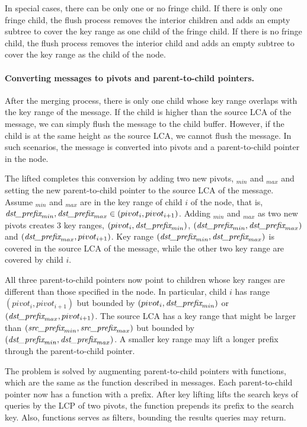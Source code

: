 In special cases, there can be only one or no fringe child.
If there is only one fringe child, the flush process removes the interior
children and adds an empty subtree to cover the key range as one child of the
fringe child.
If there is no fringe child, the flush process removes the interior child and
adds an empty subtree to cover the key range as the child of the node.

\paragraph{Converting \goto messages to pivots and parent-to-child pointers.}
After the merging process, there is only one child whose key range overlaps
with the key range of the \goto message.
If the child is higher than the source LCA of the \goto message,
we can simply flush the \goto message to the child buffer.
However, if the child is at the same height as the source LCA,
we cannot flush the \goto message.
In such scenarios, the \goto message is converted into pivots and a
parent-to-child pointer in the node.

The lifted \bedag completes this conversion by adding two new pivots,
\dpre$_{min}$ and \dpre$_{max}$ and
setting the new parent-to-child pointer to the source LCA of the
\goto message.
Assume \dpre$_{min}$ and \dpre$_{max}$ are in the key range of child $i$ of the node,
that is, $\textit{dst\_prefix}_{min}, \textit{dst\_prefix}_{max} \in (pivot_{i},pivot_{i+1})$.
Adding \dpre$_{min}$ and \dpre$_{max}$ as two new pivots creates 3 key ranges,
$(pivot_{i},\textit{dst\_prefix}_{min})$, $(\textit{dst\_prefix}_{min},\textit{dst\_prefix}_{max})$ and
$(\textit{dst\_prefix}_{max}, pivot_{i+1})$.
Key range $(\textit{dst\_prefix}_{min},\textit{dst\_prefix}_{max})$ is covered in the source LCA of the \goto
message, while the other two key range are covered by child $i$.

All three parent-to-child pointers now point to children whose key
ranges are different than those specified in the node.
In particular, child $i$ has range $(pivot_{i},pivot_{i+1})$ but bounded by
$(pivot_{i},\textit{dst\_prefix}_{min})$ or $(\textit{dst\_prefix}_{max}, pivot_{i+1})$.
The source LCA has a key range that might be larger than
$(\textit{src\_prefix}_{min}, \textit{src\_prefix}_{max})$ but bounded by $(\textit{dst\_prefix}_{min},\textit{dst\_prefix}_{max})$.
A smaller key range may lift a longer prefix through the parent-to-child
pointer.

The problem is solved by augmenting parent-to-child pointers with \xf functions,
which are the same as the \xf function described in \goto messages.
Each parent-to-child pointer now has a \xf function with a prefix.
After key lifting lifts the search keys of queries by the LCP of two pivots,
the \xf function prepends its prefix to the search key.
Also, \xf functions serves as filters, bounding the results queries may return.

